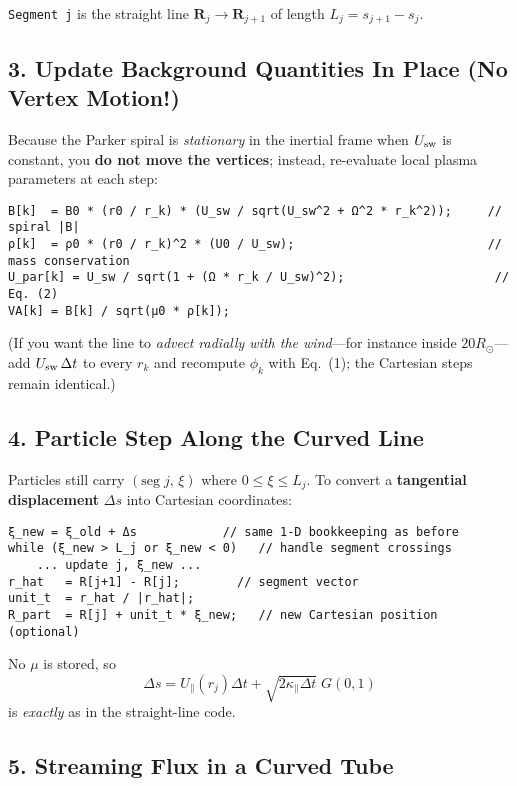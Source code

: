\noindent
\texttt{Segment j} is the straight line $\mathbf{R}_j \to \mathbf{R}_{j+1}$ of length $L_j = s_{j+1} - s_j$.

\subsection*{3. Update Background Quantities In Place (No Vertex Motion!)}

Because the Parker spiral is \textit{stationary} in the inertial frame when $U_{\rm sw}$ is constant, you \textbf{do not move the vertices}; instead, re-evaluate local plasma parameters at each step:

\begin{verbatim}
B[k]  = B0 * (r0 / r_k) * (U_sw / sqrt(U_sw^2 + Ω^2 * r_k^2));     // spiral |B|
ρ[k]  = ρ0 * (r0 / r_k)^2 * (U0 / U_sw);                           // mass conservation
U_par[k] = U_sw / sqrt(1 + (Ω * r_k / U_sw)^2);                     // Eq. (2)
VA[k] = B[k] / sqrt(μ0 * ρ[k]);
\end{verbatim}

\smallskip
(If you want the line to \textit{advect radially with the wind}---for instance inside $20 R_\odot$---add $U_{\rm sw}\,\Delta t$ to every $r_k$ and recompute $\phi_k$ with Eq.~(1); the Cartesian steps remain identical.)

\subsection*{4. Particle Step Along the Curved Line}

Particles still carry $(\text{seg}\;j,\,\xi)$ where $0 \leq \xi \leq L_j$.
To convert a \textbf{tangential displacement} $\Delta s$ into Cartesian coordinates:

\begin{verbatim}
ξ_new = ξ_old + Δs            // same 1-D bookkeeping as before
while (ξ_new > L_j or ξ_new < 0)   // handle segment crossings
    ... update j, ξ_new ...
r_hat   = R[j+1] - R[j];        // segment vector
unit_t  = r_hat / |r_hat|;
R_part  = R[j] + unit_t * ξ_new;   // new Cartesian position (optional)
\end{verbatim}

No $\mu$ is stored, so 
\[
\Delta s = U_{\parallel}(r_j) \Delta t + \sqrt{2 \kappa_{\parallel} \Delta t} \; G(0,1)
\]
is \textit{exactly} as in the straight-line code.

\subsection*{5. Streaming Flux in a Curved Tube}

